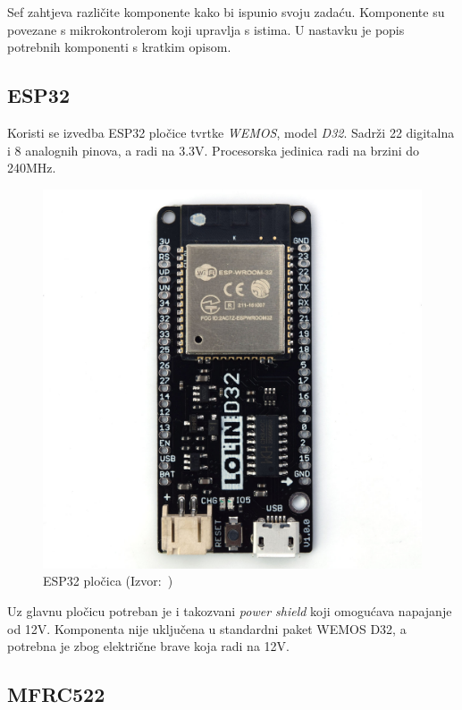 Sef zahtjeva različite komponente kako bi ispunio svoju zadaću.
Komponente su povezane s mikrokontrolerom koji upravlja s istima.
U nastavku je popis potrebnih komponenti s kratkim opisom.

\subsection{ESP32}

Koristi se izvedba ESP32 pločice tvrtke \textit{WEMOS}, model \textit{D32}.
Sadrži 22 digitalna i 8 analognih pinova, a radi na 3.3V\@.
Procesorska jedinica radi na brzini do 240MHz.

\begin{figure}[h!]
    \centering
    \includegraphics[scale=0.5]{images/d32_lolin}
    \caption{ESP32 pločica (Izvor:~\cite{wemos-docs})}
\end{figure}

Uz glavnu pločicu potreban je i takozvani \textit{power shield} koji omogućava napajanje od 12V\@.
Komponenta nije uključena u standardni paket WEMOS D32, a potrebna je zbog električne brave koja radi na 12V\@.

\pagebreak

\subsection{MFRC522}

